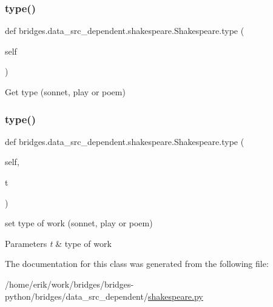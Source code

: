 \subsubsection{\texorpdfstring{type()}{type()}\hspace{0.1cm}{\footnotesize\ttfamily [1/2]}}
{\footnotesize\ttfamily def bridges.\+data\+\_\+src\+\_\+dependent.\+shakespeare.\+Shakespeare.\+type (\begin{DoxyParamCaption}\item[{}]{self }\end{DoxyParamCaption})}



Get type (sonnet, play or poem) 

\mbox{\label{classbridges_1_1data__src__dependent_1_1shakespeare_1_1_shakespeare_a9b4489402fda80ec8360bb17ad3d0af9}} 
\subsubsection{\texorpdfstring{type()}{type()}\hspace{0.1cm}{\footnotesize\ttfamily [2/2]}}
{\footnotesize\ttfamily def bridges.\+data\+\_\+src\+\_\+dependent.\+shakespeare.\+Shakespeare.\+type (\begin{DoxyParamCaption}\item[{}]{self,  }\item[{}]{t }\end{DoxyParamCaption})}



set type of work (sonnet, play or poem) 


\begin{DoxyParams}{Parameters}
{\em t} & type of work \\
\hline
\end{DoxyParams}


The documentation for this class was generated from the following file\+:\begin{DoxyCompactItemize}
\item 
/home/erik/work/bridges/bridges-\/python/bridges/data\+\_\+src\+\_\+dependent/\hyperlink{shakespeare_8py}{shakespeare.\+py}\end{DoxyCompactItemize}
